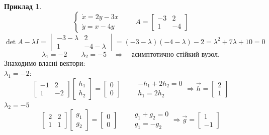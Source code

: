 \documentclass[14pt,a4paper]{scrartcl}
\theoremstyle{definition}
\newtheorem*{example}{Приклад}
\theoremstyle{definition}
\theoremstyle{definition}
\begin{document}
\begin{example}
    $$
    \begin{cases}
    \dot{x} = 2y - 3x\\
    \dot{y} = x - 4y
    \end{cases} \qquad A = \begin{bmatrix}
     -3 & 2 \\
     1 & -4
    \end{bmatrix}
    $$
    $$
    \det{A - \lambda I} = \begin{vmatrix}
      -3 - \lambda & 2 \\
      1 & -4 - \lambda
    \end{vmatrix}  = (-3-\lambda) (-4 - \lambda) -2 = \lambda^2 + 7 \lambda + 10 = 0
    $$
    $$
    \lambda_1 = -2 \qquad \lambda_2 = -5 \quad \Longrightarrow \quad \text{асимптотично стійкий вузол.}
    $$
    Знаходимо власні вектори:\\
    $\lambda_1 = -2$:
    $$
    \begin{bmatrix}
     -1 & 2 \\
     1 & -2
    \end{bmatrix} \begin{bmatrix}
     h_1 \\
     h_2
    \end{bmatrix} = \begin{bmatrix}
     0 \\
     0
    \end{bmatrix} \qquad \begin{gathered}
     -h_1 + 2h_2 = 0\\
     h_1 = 2 h_2
    \end{gathered} \Rightarrow \overrightarrow{h} = \begin{bmatrix}
     2 \\
     1
    \end{bmatrix}
    $$
    $\lambda_2 = -5$
    $$
    \begin{bmatrix}
     2 & 2 \\
     1 & 1
    \end{bmatrix} \begin{bmatrix}
     g_1 \\
     g_2
    \end{bmatrix} = \begin{bmatrix}
     0 \\
     0
    \end{bmatrix}
    \qquad \begin{gathered}
     g_1 + g_2 = 0\\
     g_1 = - g_2
    \end{gathered} \Rightarrow \overrightarrow{g} = \begin{bmatrix}
     1 \\
     -1
    \end{bmatrix}
    $$


\end{example}
\end{document}
